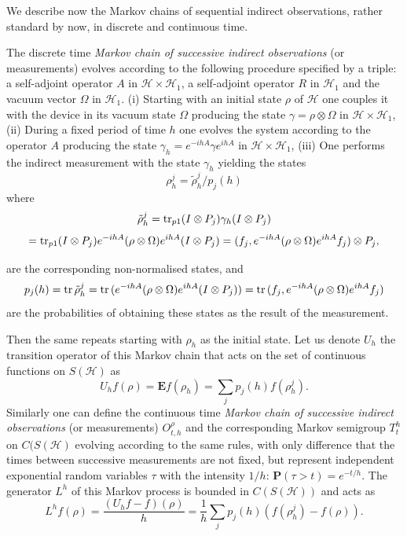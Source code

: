 \documentclass[12pt]{article}
\def\HC{\mathcal{H}}
\def\E{\mathbf{E}}
\def\P{\mathbf{P}}
\def\tr{\rm{tr}}
\def\ga{\gamma}
\newcommand{\Om}{\Omega}
\begin{document}
We describe now the
Markov chains of sequential indirect observations, rather standard by now,
in discrete and continuous time.


The discrete time {\it Markov chain of successive indirect observations} (or measurements) evolves according
to the following procedure specified by a triple: a self-adjoint  operator $A$ in $\HC\times \HC_1$,
a self-adjoint operator $R$ in $\HC_1$ and the vacuum vector $\Om$ in $\HC_1$.
(i) Starting with an initial state $\rho$ of $\HC$ one couples it with the device in its vacuum state $\Om$
producing the state $\ga=\rho\otimes \Om$ in $\HC\times \HC_1$,
(ii) During a fixed period of time $h$ one evolves the system according to the operator $A$ producing the state
$\ga_h=e^{-ihA}\ga e^{ihA}$ in $\HC\times \HC_1$,
(iii) One performs the indirect measurement with the state $\ga_h$ yielding the states
\begin{equation}
\label{eqMarkchain}
\rho_h^j=\tilde \rho_h^j/ p_j(h)
\end{equation}
where
\[
\tilde \rho_h^j ={\tr}_{p1} (I\otimes P_j)\ga_h (I\otimes P_j)
\]
\begin{equation}
\label{eqMarkchain0}
={\tr}_{p1} (I\otimes P_j)e^{-ihA}(\rho\otimes \Om) e^{ihA} (I\otimes P_j)
=(f_j, e^{-ihA}(\rho\otimes \Om) e^{ihA} f_j) \otimes P_j,
\end{equation}

are the corresponding non-normalised states, and
\begin{equation}
\label{eqMarkchain1}
p_j(h)={\tr} \, \tilde \rho_h^j
={\tr} \, (e^{-ihA}(\rho\otimes \Om) e^{ihA}  (I\otimes P_j))
={\tr}\, (f_j, e^{-ihA}(\rho\otimes \Om) e^{ihA} f_j)
\end{equation}
are the probabilities of obtaining these states as the result of the measurement.

Then the same repeats starting with $\rho_h$ as the initial state.  Let us denote $U_h$ the transition
operator of this Markov chain that acts on the set of continuous functions on $S(\HC)$ as
\begin{equation}
\label{eqMarkchain2}
U_h f(\rho)=\E f(\rho_h)=\sum_j p_j(h) f(\rho_h^j).
\end{equation}
Similarly one can define the continuous time
{\it Markov chain of successive indirect observations} (or measurements)
$O^{\rho}_{t,h}$ and the corresponding Markov semigroup $T_t^h$ on $C(S(\HC)$
evolving according to the same rules, with only difference that the times between successive measurements
are not fixed, but represent independent exponential random  variables $\tau$ with
the intensity $1/h$: $\P(\tau>t)=e^{-t/h}$.
The generator $L^h$ of this Markov process is bounded in $C(S(\HC))$ and acts as
\begin{equation}
\label{eqMarkchain3}
L^hf(\rho)=\frac{(U_hf-f)(\rho)}{h}=\frac{1}{h}\sum_j p_j(h) (f(\rho_h^j)-f(\rho)).
\end{equation}
\end{document}
